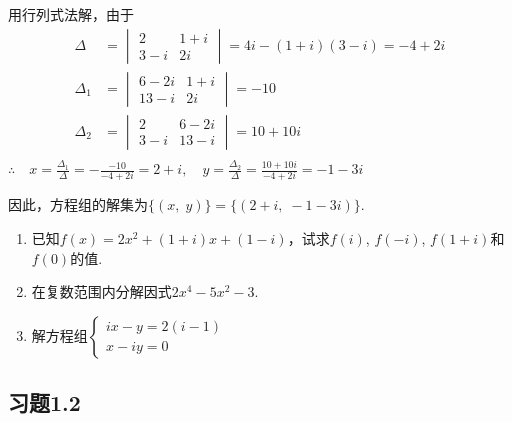 \begin{solution}
   用行列式法解，由于
\[\begin{split}
    \Delta&=\begin{vmatrix}
    2& 1+i\\
    3-i& 2i
\end{vmatrix}=4i-(1+i)(3-i)=-4+2i\\
\Delta_{1}&=\begin{vmatrix}
   6- 2i& 1+i\\
    13-i& 2i
\end{vmatrix}=-10\\
\Delta_{2}&=\begin{vmatrix}
    2& 6-2i\\
     3-i& 13-i
 \end{vmatrix}=10+10i\\
\end{split}\]
$\therefore\quad x= \frac {\Delta_{1}}{\Delta} = - \frac {- 10}{- 4+ 2i}= 2+ i,\quad 
y=\frac{\Delta_{2}}{\Delta}=\frac{10+10i}{-4+2i}=-1-3i$

因此，方程组的解集为$\{(x,\; y)\}=\{(2+i,\;  -1-3i)\}$.
\end{solution}

\begin{ex}
\begin{enumerate}
    \item 已知$f(x)=2x^2+(1+i)x+(1-i)$，试求$f(i)$, $f(-i)$, $f(1+i)$和$f(0)$的值.
    \item 在复数范围内分解因式$2x^4-5x^2-3$.
    \item 解方程组$\begin{cases}
        ix-y=2(i-1)\\
        x-iy=0
    \end{cases}$
\end{enumerate}
\end{ex}

\subsection*{习题1.2}

